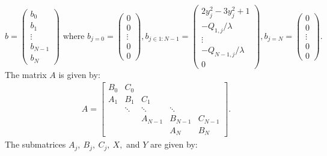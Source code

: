 \documentclass[reqno, 12pt]{amsart}
\begin{document}
    \begin{equation*}
        b = \begin{pmatrix} b_0 \\ b_1 \\ \vdots \\ b_{N-1} \\ b_N \end{pmatrix} \text{ where }
        b_{j = 0} = \begin{pmatrix} 0 \\ 0 \\ \vdots \\ 0 \\ 0 \end{pmatrix},
        b_{j \in 1:N-1} = \begin{pmatrix} 2y_j^2 - 3y_j^2 + 1 \\ -Q_{1,j}/\lambda \\ \vdots \\ -Q_{N-1,j}/\lambda \\ 0 \end{pmatrix},
        b_{j = N} = \begin{pmatrix} 0 \\ 0 \\ \vdots \\ 0 \\ 0 \end{pmatrix}.
    \end{equation*}
    The matrix $A$ is given by:
    \begin{gather}
        A = \begin{bmatrix} B_0 & C_0 \\ 
                            A_1 & B_1 & C_1 \\
                                & \ddots & \ddots & \ddots \\
                                && A_{N-1} & B_{N-1} & C_{N-1} \\
                                &&        & A_N & B_{N}
                        \end{bmatrix}.
    \end{gather}
    The submatrices $A_j,\ B_j,\ C_j,\ X,$ and $Y$ are given by:
\end{document}
